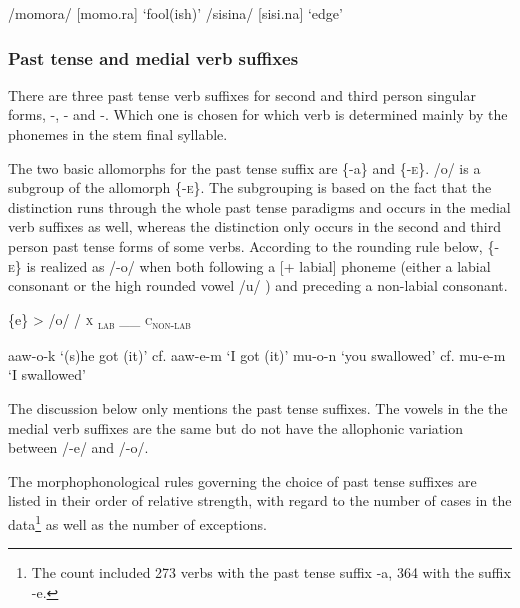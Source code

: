 \ea
\ea
/momora/  [mo{{\textprimstress}mo.ra}]  `fool(ish)'
\ex
/sisina/  [si{{\textprimstress}si.na}]  `edge'
\z
\z

\subsubsection{Past tense and medial verb suffixes}\footnotemark{}\label{sec:2.3.3.3}

There are three past tense verb suffixes for second and third person singular forms, -, - and -.  Which one is chosen for which verb is determined mainly by the phonemes in the stem final syllable. 

The two basic allomorphs for the past tense suffix are \{-a\} and \{-\textsc{e}\}. /\textstyleStyleVernacularWordsItalic{-}o/ is a subgroup of the allomorph \{-\textsc{e}\}. The subgrouping is based on the fact that the  distinction runs through the whole past tense paradigms and occurs in the medial verb suffixes as well, whereas the \textstyleStyleVernacularWordsItalic{-} distinction only occurs in the second and third person past tense forms of some verbs.  According to the rounding rule below, \{-\textsc{e}\} is realized as /-o/ when both following a [+ labial] phoneme (either a labial consonant or the high rounded vowel /u/ ) and preceding a non-labial consonant. 

\ea
\{e\} {{\textgreater}} /o/  /  \textsc{x} \textsubscript{\textsc{lab}}  \_\_  \textsc{c}\textsubscript{\textsc{non-lab}} 
\z

\ea
\ea
aaw-o-k  `(s)he got (it)'  cf.  aaw-e-m  `I got (it)'
\ex
mu-o-n  `you swallowed'  cf.  mu-e-m  `I swallowed'
\z
\z

The discussion below only mentions the past tense suffixes. The vowels in the  the medial verb suffixes are the same but do not have the allophonic variation between /-e/ and /-o/.  

The morphophonological rules governing the choice of past tense suffixes are listed in their order of relative strength, with regard to the number of cases in the data\footnote{The count included 273 verbs with the past tense suffix  -a,  364 with the suffix -e.} as well as the number of exceptions.

